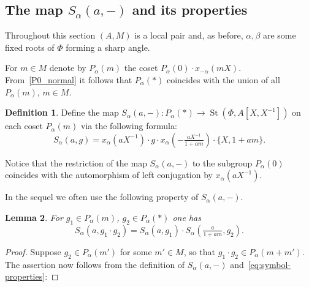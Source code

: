 \documentclass[10pt,a4paper,twoside]{article}
\newtheorem{lemma}{Lemma}
\theoremstyle{remark}
\theoremstyle{definition}
\numberwithin{lemma}{section}
\numberwithin{prop}{section}
\numberwithin{corollary}{section}
\numberwithin{externaltheorem}{section}
\newtheorem{df}[lemma]{Definition} \Crefname{df}{Definition}{Definitions}
\DeclareMathOperator{\St}{St}
\numberwithin{equation}{section}
\begin{document}
\subsection{The map \texorpdfstring{$S_\alpha(a, -)$}{S(a,-)} and its properties} \label{sec:S-a}
Throughout this section $(A, M)$ is a local pair and, as before, $\alpha, \beta$ are some fixed roots of $\Phi$ forming a sharp angle.

For $m \in M$ denote by $P_\alpha(m)$ the coset $P_\alpha(0) \cdot x_{-\alpha}(mX)$.
From~\cref{P0_normal} it follows that $P_\alpha(*)$ coincides with the union of all $P_\alpha(m)$, $m\in M$. 
\begin{df}\label{S-def}
Define the map $S_\alpha(a, -) \colon P_\alpha(*) \to \St(\Phi, A[X, X^{-1}])$ on each coset $P_\alpha(m)$ via the following formula:
\begin{equation}\label{eq:S-def} S_\alpha(a, g) = x_\alpha(aX^{-1})\cdot g \cdot x_\alpha\left(-\tfrac{aX^{-1}}{1 + am}\right) \cdot \{X, 1+ am\}.\end{equation} \end{df}
Notice that the restriction of the map $S_\alpha(a, -)$ to the subgroup $P_\alpha(0)$ coincides with the automorphism of left conjugation by $x_\alpha(aX^{-1})$.

In the sequel we often use the following property of $S_\alpha(a, -)$.
\begin{lemma} \label{lem:Smult}
For $g_1 \in P_\alpha(m)$, $g_2 \in P_\alpha(*)$ one has
\[S_\alpha(a, g_1\cdot g_2) = S_\alpha(a, g_1) \cdot S_\alpha\left(\tfrac{a}{1+am}, g_2\right).\]
\end{lemma} \begin{proof} Suppose $g_2\in P_\alpha(m')$ for some $m' \in M$, so that $g_1 \cdot g_2 \in P_\alpha(m + m')$. The assertion now follows from the definition of $S_\alpha(a, -)$ and~\eqref{eq:symbol-properties}:
\newline{}
\end{proof}
\end{document}
